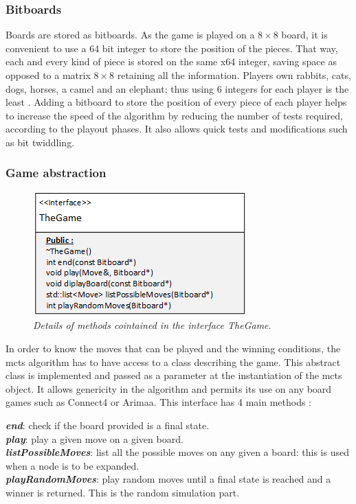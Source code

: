\subsubsection{Bitboards}
Boards are stored as bitboards. As the game is played on a \ensuremath{8\times8} board, it is convenient to use a 64 bit integer to store the position of the pieces. That way, each and every kind of piece is stored on the same x64 integer, saving space as opposed to a matrix \ensuremath{8\times8} retaining all the information. Players own rabbits, cats, dogs, horses, a camel and an elephant; thus using 6 integers for each player is the least . Adding a bitboard to store the position of every piece of each player helps to increase the speed of the algorithm by reducing the number of tests required, according to the playout phases. It also allows quick tests and modifications such as bit twiddling.%

\subsubsection{Game abstraction}
\begin{figure}[H] 
\centerline{\includegraphics[scale=0.8]{Data_Structure/Img/TheGame.png}}
\caption{\label{fig:thegamedetails}\textit{Details of methods cointained in the interface TheGame}.}
\end{figure}
In order to know the moves that can be played and the winning conditions, the mcts algorithm has to have access to a class describing the game. This abstract class is implemented and passed as a parameter at the instantiation of the mcts object. It allows genericity in the algorithm and permits its use on any board games such as Connect4 or Arimaa. This interface has 4 main methods : 

\noindent
\textit{\textbf{end}}: check if the board provided is a final state.
\medskip\\
\textit{\textbf{play}}: play a given move on a given board.
\medskip\\
\textit{\textbf{listPossibleMoves}}: list all the possible moves on any given a board: this is used when a node is to be expanded.
\medskip\\
\textit{\textbf{playRandomMoves}}: play random moves until a final state is reached and a winner is returned. This is the random simulation part.

